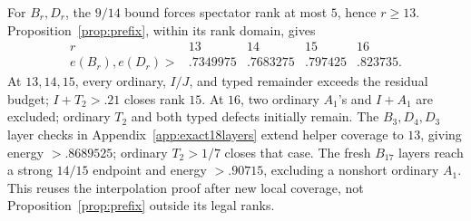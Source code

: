 \documentclass[11pt]{article}
\theoremstyle{definition}
\theoremstyle{remark}
\begin{document}
For \(B_r,D_r\), the \(9/14\) bound forces spectator rank
at most \(5\), hence \(r\geq13\).
Proposition~\ref{prop:prefix}, within its rank domain, gives
\[
\begin{array}{c|rrrr}
r&13&14&15&16\\ \hline
e(B_r),e(D_r)>&.7349975&.7683275&.797425&.823735.
\end{array}
\]
At \(13,14,15\), every ordinary, \(I/J\), and typed remainder
exceeds the residual budget; \(I+T_2>.21\) closes rank \(15\).
At \(16\), two ordinary \(A_1\)'s and \(I+A_1\) are excluded;
ordinary \(T_2\) and both typed defects initially remain.
The \(B_3,D_4,D_3\) layer checks in
Appendix~\ref{app:exact18layers} extend helper coverage to \(13\), giving
energy \(>.8689525\); ordinary \(T_2>1/7\) closes that case.
The fresh \(B_{17}\) layers reach a strong \(14/15\) endpoint
and energy \(>.90715\), excluding a nonshort ordinary \(A_1\).
This reuses the interpolation proof after new local coverage,
not Proposition~\ref{prop:prefix} outside its legal ranks.
\end{document}
